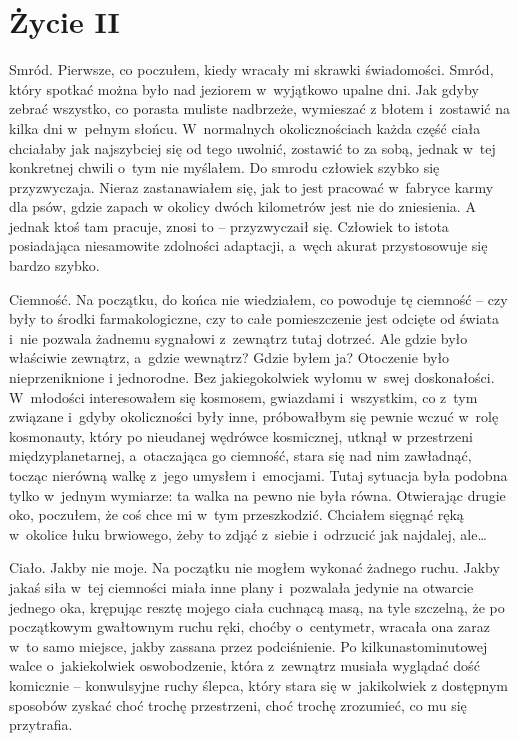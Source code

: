 \chapter{Życie II}

Smród. Pierwsze, co poczułem, kiedy wracały mi skrawki świadomości. Smród, który spotkać można było nad jeziorem w~wyjątkowo upalne dni. Jak gdyby zebrać wszystko, co porasta muliste nadbrzeże, wymieszać z błotem i~zostawić na kilka dni w~pełnym słońcu. W~normalnych okolicznościach każda część ciała chciałaby jak najszybciej się od tego uwolnić, zostawić to za sobą, jednak w~tej konkretnej chwili o~tym nie myślałem. Do smrodu człowiek szybko się przyzwyczaja. Nieraz zastanawiałem się, jak to jest pracować w~fabryce karmy dla psów, gdzie zapach w okolicy dwóch kilometrów jest nie do zniesienia. A jednak ktoś tam pracuje, znosi to -- przyzwyczaił się. Człowiek to istota posiadająca niesamowite zdolności adaptacji, a~węch akurat przystosowuje się bardzo szybko. 

Ciemność. Na początku, do końca nie wiedziałem, co powoduje tę ciemność -- czy były to środki farmakologiczne, czy to całe pomieszczenie jest odcięte od świata i~nie pozwala żadnemu sygnałowi z~zewnątrz tutaj dotrzeć. Ale gdzie było właściwie zewnątrz, a~gdzie wewnątrz? Gdzie byłem ja? Otoczenie było nieprzeniknione i jednorodne. Bez jakiegokolwiek wyłomu w~swej doskonałości. W~młodości interesowałem się kosmosem, gwiazdami i~wszystkim, co z~tym związane i~gdyby okoliczności były inne, próbowałbym się pewnie wczuć w~rolę kosmonauty, który po nieudanej wędrówce kosmicznej, utknął w przestrzeni międzyplanetarnej, a~otaczająca go ciemność, stara się nad nim zawładnąć, tocząc nierówną walkę z~jego umysłem i~emocjami. Tutaj sytuacja była podobna tylko w~jednym wymiarze: ta walka na pewno nie była równa. Otwierając drugie oko, poczułem, że coś chce mi w~tym przeszkodzić. Chciałem sięgnąć ręką w~okolice łuku brwiowego, żeby to zdjąć z~siebie i~odrzucić jak najdalej, ale… 

Ciało. Jakby nie moje. Na początku nie mogłem wykonać żadnego ruchu. Jakby jakaś siła w~tej ciemności miała inne plany i~pozwalała jedynie na otwarcie jednego oka, krępując resztę mojego ciała cuchnącą masą, na tyle szczelną, że po początkowym gwałtownym ruchu ręki, choćby o~centymetr, wracała ona zaraz w~to samo miejsce, jakby zassana przez podciśnienie. Po kilkunastominutowej walce o~jakiekolwiek oswobodzenie, która z~zewnątrz musiała wyglądać dość komicznie -- konwulsyjne ruchy ślepca, który stara się w~jakikolwiek z dostępnym sposobów zyskać choć trochę przestrzeni, choć trochę zrozumieć, co mu się przytrafia. 

